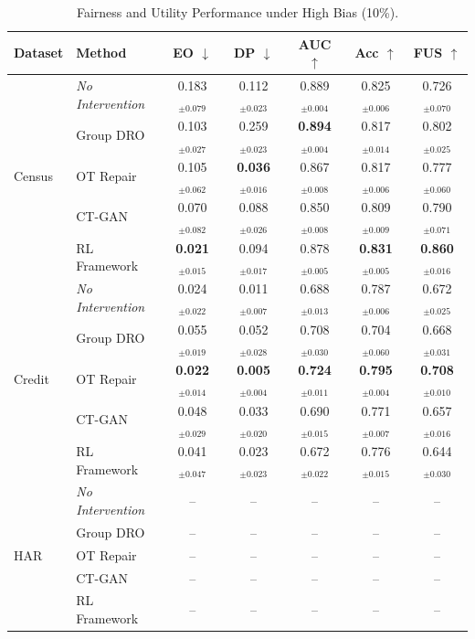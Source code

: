 \begin{table}[t]
\centering
\setlength{\tabcolsep}{5pt}
\caption{Fairness and Utility Performance under High Bias (10\%).}
\label{tab:010_compressed}
\begin{tabular}{llccccc}
\toprule
Dataset & Method & EO $\downarrow$ & DP $\downarrow$ & AUC $\uparrow$ & Acc $\uparrow$ & FUS $\uparrow$ \\
\midrule
\multirow{5}{*}{Census} & \textit{No Intervention} & 0.183$_{\pm 0.079}$ & 0.112$_{\pm 0.023}$ & 0.889$_{\pm 0.004}$ & 0.825$_{\pm 0.006}$ & 0.726$_{\pm 0.070}$ \\
 & Group DRO & 0.103$_{\pm 0.027}$ & 0.259$_{\pm 0.023}$ & \textbf{0.894$_{\pm 0.004}$} & 0.817$_{\pm 0.014}$ & 0.802$_{\pm 0.025}$ \\
 & OT Repair & 0.105$_{\pm 0.062}$ & \textbf{0.036$_{\pm 0.016}$} & 0.867$_{\pm 0.008}$ & 0.817$_{\pm 0.006}$ & 0.777$_{\pm 0.060}$ \\
 & CT-GAN & 0.070$_{\pm 0.082}$ & 0.088$_{\pm 0.026}$ & 0.850$_{\pm 0.008}$ & 0.809$_{\pm 0.009}$ & 0.790$_{\pm 0.071}$ \\
 & RL Framework & \textbf{0.021$_{\pm 0.015}$} & 0.094$_{\pm 0.017}$ & 0.878$_{\pm 0.005}$ & \textbf{0.831$_{\pm 0.005}$} & \textbf{0.860$_{\pm 0.016}$} \\
\midrule
\multirow{5}{*}{Credit} & \textit{No Intervention} & 0.024$_{\pm 0.022}$ & 0.011$_{\pm 0.007}$ & 0.688$_{\pm 0.013}$ & 0.787$_{\pm 0.006}$ & 0.672$_{\pm 0.025}$ \\
 & Group DRO & 0.055$_{\pm 0.019}$ & 0.052$_{\pm 0.028}$ & 0.708$_{\pm 0.030}$ & 0.704$_{\pm 0.060}$ & 0.668$_{\pm 0.031}$ \\
 & OT Repair & \textbf{0.022$_{\pm 0.014}$} & \textbf{0.005$_{\pm 0.004}$} & \textbf{0.724$_{\pm 0.011}$} & \textbf{0.795$_{\pm 0.004}$} & \textbf{0.708$_{\pm 0.010}$} \\
 & CT-GAN & 0.048$_{\pm 0.029}$ & 0.033$_{\pm 0.020}$ & 0.690$_{\pm 0.015}$ & 0.771$_{\pm 0.007}$ & 0.657$_{\pm 0.016}$ \\
 & RL Framework & 0.041$_{\pm 0.047}$ & 0.023$_{\pm 0.023}$ & 0.672$_{\pm 0.022}$ & 0.776$_{\pm 0.015}$ & 0.644$_{\pm 0.030}$ \\
\midrule
\multirow{5}{*}{HAR} & \textit{No Intervention} & -- & -- & -- & -- & -- \\
 & Group DRO & -- & -- & -- & -- & -- \\
 & OT Repair & -- & -- & -- & -- & -- \\
 & CT-GAN & -- & -- & -- & -- & -- \\
 & RL Framework & -- & -- & -- & -- & -- \\
\bottomrule
\end{tabular}
\end{table}
